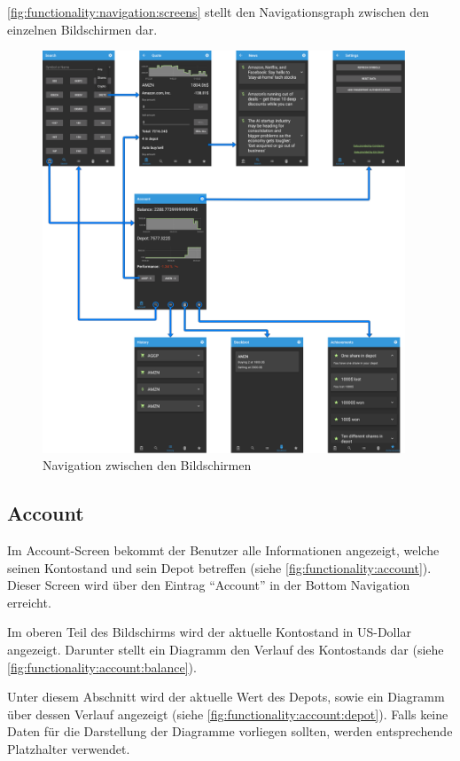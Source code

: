 \documentclass[a4paper]{article}
\begin{document}
\autoref{fig:functionality:navigation:screens} stellt den Navigationsgraph zwischen den einzelnen Bildschirmen dar.
\begin{figure}[H]
	\centering
	\includegraphics[height=12cm]{./images/navigation_screens/navigation_screens.png}
	\caption{Navigation zwischen den Bildschirmen}
	\label{fig:functionality:navigation:screens}
\end{figure}


\subsection{Account}
\label{subsec:functionality:account}
Im Account-Screen bekommt der Benutzer alle Informationen angezeigt, welche seinen Kontostand und sein Depot betreffen (siehe \autoref{fig:functionality:account}). Dieser Screen wird über den Eintrag "`Account"' in der Bottom Navigation erreicht.

Im oberen Teil des Bildschirms wird der aktuelle Kontostand in US-Dollar angezeigt. Darunter stellt ein Diagramm den Verlauf des Kontostands dar (siehe \autoref{fig:functionality:account:balance}).

Unter diesem Abschnitt wird der aktuelle Wert des Depots, sowie ein Diagramm über dessen Verlauf angezeigt (siehe \autoref{fig:functionality:account:depot}).
Falls keine Daten für die Darstellung der Diagramme vorliegen sollten, werden entsprechende Platzhalter verwendet.
\end{document}
